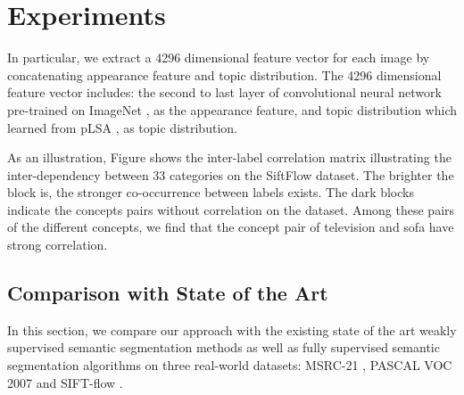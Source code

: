 \section{Experiments}
In particular, we extract a 4296 dimensional feature vector for each image by concatenating appearance feature and topic distribution. The 4296 dimensional feature vector includes: the second to last layer of convolutional neural network\cite{simonyan2014very} pre-trained on ImageNet \cite{russakovsky2014imagenet}, as the appearance feature, and topic distribution which learned from pLSA \cite{hofmann1999probabilistic}, as topic distribution.

As an illustration, Figure shows the inter-label correlation matrix illustrating the inter-dependency between 33 categories on the SiftFlow dataset. The brighter the block is, the stronger co-occurrence between labels exists. The dark blocks indicate the concepts pairs without correlation on the dataset.
Among these pairs of the different concepts, we find that the concept pair of television and sofa have strong correlation.


\subsection{Comparison with State of the Art}
In this section, we compare our approach with the existing state of the art weakly supervised semantic segmentation methods as well as fully supervised semantic segmentation algorithms on three real-world datasets: MSRC-21 \cite{shotton2006textonboost}, PASCAL VOC 2007 \cite{pascal-voc-2007} and SIFT-flow \cite{liu2011nonparametric}.

